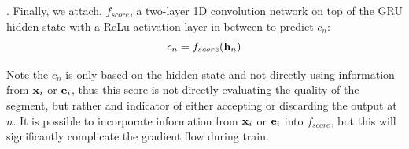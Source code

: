 \documentclass[10pt,journal,compsoc]{IEEEtran}
\begin{document}




. Finally, we attach, $f_{score}$, a two-layer 1D convolution network on top of the GRU hidden state with a ReLu activation layer in between to predict $c_n$:
\begin{equation}
	c_{n} = f_{score}({\bf h}_n)
\end{equation}

Note the $c_n$ is only based on the hidden state and not directly using information from ${\bf x}_i$ or ${\bf e}_i$, thus this score is not directly evaluating the quality of the segment, but rather and indicator of either accepting or discarding the output at $n$. It is possible to incorporate information from ${\bf x}_i$ or ${\bf e}_i$ into $f_{score}$, but this will significantly complicate the gradient flow during train. 
\end{document}
